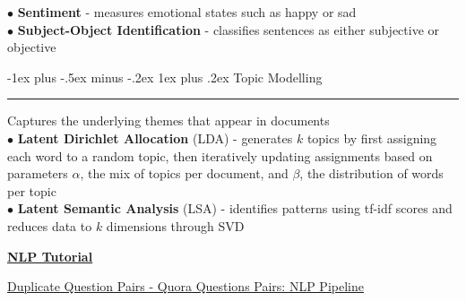 \documentclass[letterpaper, 10.5pt,landscape]{article}
\makeatletter
\renewcommand{\section}{\@startsection{section}{1}{0mm}%
                                {-1ex plus -.5ex minus -.2ex}%
                                {0.1ex plus .2ex}%
                                {\normalfont\small}}
\renewcommand{\subsubsection}{\@startsection{subsubsection}{3}{0mm}%
                                {-1ex plus -.5ex minus -.2ex}%
                                {1ex plus .2ex}%
                                {\normalfont\small\bfseries}}
\makeatother
\begin{document}
\begin{multicols*}{3}
$\bullet$ \textbf{Sentiment} - measures emotional states such as happy or sad \\
$\bullet$ \textbf{Subject-Object Identification} - classifies sentences as either subjective or objective



\subsubsection{Topic Modelling}  {\color{teal}\hrule height 0.5pt} \smallskip
Captures the underlying themes that appear in documents\\
$\bullet$ \textbf{Latent Dirichlet Allocation} (LDA) - generates $k$ topics by first assigning each word to a random topic, then iteratively updating assignments based on parameters $\alpha$, the mix of topics per document, and $\beta$, the distribution of words per topic \\

$\bullet$ \textbf{Latent Semantic Analysis} (LSA) - identifies patterns using tf-idf scores and reduces data to $k$ dimensions through SVD

\vspace{10pt}

\href{https://www.youtube.com/watch?v=ruyyyRp79uQ&list=PLkz_y24mlSJarFAx94xU17AJ7QJNG1Erl}{\textbf{NLP Tutorial}}

\href{https://www.youtube.com/watch?v=1fvQU5yPjFs&list=PLKnIA16_RmvZo7fp5kkIth6nRTeQQsjfX&index=8}{Duplicate Question Pairs - Quora Questions Pairs: NLP Pipeline}



\vspace*{\fill}
\columnbreak








\nocite{LSTM_languageModeling} 
\nocite{LSTMwind}
\nocite{analog-dialogue}
\nocite{deeplearning-ai-nlp}
\nocite{kaggle-nlp-pipelines}
\nocite{bobade2016survey}
\nocite{beakta2015big}
\nocite{edureka-hadoop-questions}
\nocite{edureka-mapreduce-tutorial}


\printbibliography





















\end{multicols*}
\end{document}
